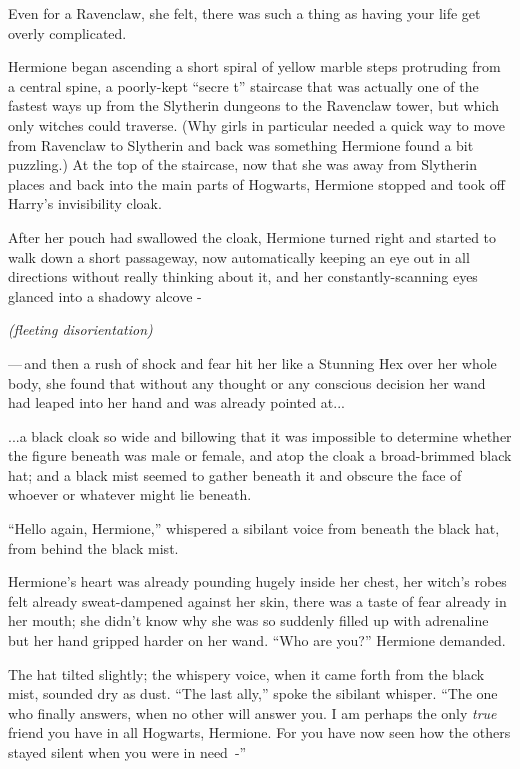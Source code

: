 Even for a Ravenclaw, she felt, there was such a thing as having your life get overly complicated.

Hermione began ascending a short spiral of yellow marble steps protruding from a central spine, a poorly-kept ``secre t'' staircase that was actually one of the fastest ways up from the Slytherin dungeons to the Ravenclaw tower, but which only witches could traverse. (Why girls in particular needed a quick way to move from Ravenclaw to Slytherin and back was something Hermione found a bit puzzling.) At the top of the staircase, now that she was away from Slytherin places and back into the main parts of Hogwarts, Hermione stopped and took off Harry's invisibility cloak.

After her pouch had swallowed the cloak, Hermione turned right and started to walk down a short passageway, now automatically keeping an eye out in all directions without really thinking about it, and her constantly-scanning eyes glanced into a shadowy alcove -

\emph{(fleeting disorientation)}

---\,and then a rush of shock and fear hit her like a Stunning Hex over her whole body, she found that without any thought or any conscious decision her wand had leaped into her hand and was already pointed at...

...a black cloak so wide and billowing that it was impossible to determine whether the figure beneath was male or female, and atop the cloak a broad-brimmed black hat; and a black mist seemed to gather beneath it and obscure the face of whoever or whatever might lie beneath.

``Hello again, Hermione,'' whispered a sibilant voice from beneath the black hat, from behind the black mist.

Hermione's heart was already pounding hugely inside her chest, her witch's robes felt already sweat-dampened against her skin, there was a taste of fear already in her mouth; she didn't know why she was so suddenly filled up with adrenaline but her hand gripped harder on her wand. ``Who are you?'' Hermione demanded.

The hat tilted slightly; the whispery voice, when it came forth from the black mist, sounded dry as dust. ``The last ally,'' spoke the sibilant whisper. ``The one who finally answers, when no other will answer you. I am perhaps the only \emph{true} friend you have in all Hogwarts, Hermione. For you have now seen how the others stayed silent when you were in need~-''

